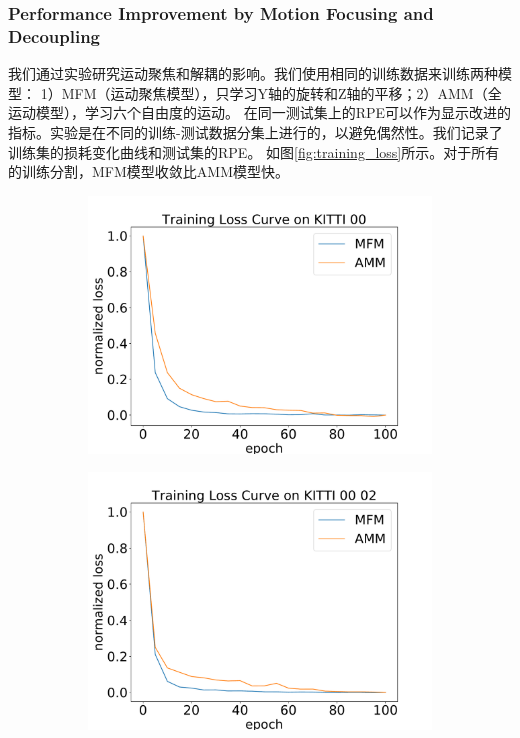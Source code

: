 {\subsubsection{{Performance Improvement by Motion Focusing and Decoupling}}
\label{sec:ego_improvement}

我们通过实验研究运动聚焦和解耦的影响。我们使用相同的训练数据来训练两种模型：
1）MFM（运动聚焦模型），只学习Y轴的旋转和Z轴的平移；2）AMM（全运动模型），学习六个自由度的运动。
在同一测试集上的RPE可以作为显示改进的指标。实验是在不同的训练-测试数据{分集}上进行的，以避免偶然性。我们记录了训练集的损耗变化曲线和测试集的{RPE}。
如图\ref{fig:training_loss}所示。对于所有的训练分割，MFM模型{收敛}比{AMM}模型快。
\begin{figure}[ht]
    \centering
    \begin{subfigure}[b]{0.45\textwidth}
        \includegraphics[width=\textwidth]{datavo/training_loss_0.pdf}
        \caption{}
        \label{fig:tl_0}
        \vspace{4pt}
    \end{subfigure}
    \begin{subfigure}[b]{0.45\textwidth}
        \includegraphics[width=\textwidth]{datavo/training_loss_0-2.pdf}

\end{subfigure}
\end{figure}}
